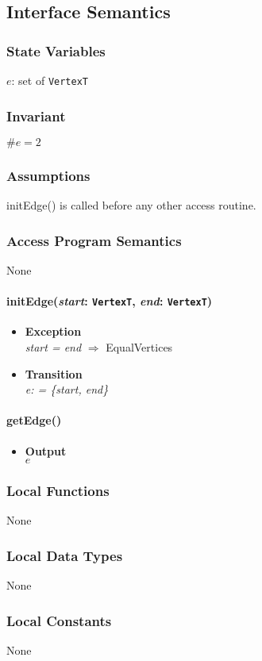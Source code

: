 \documentclass[12pt,titlepage]{article}
\begin{document}
\subsection{Interface Semantics}
\subsubsection{State Variables}
$e$: set of {\tt VertexT}
\subsubsection{Invariant} $\# e = 2$
\subsubsection{Assumptions}initEdge() is called before any other access routine.
\subsubsection{Access Program Semantics} None
\paragraph{initEdge({\it start}: {\tt VertexT}, {\it end}: {\tt VertexT})}
\begin{itemize}
\item \textbf{Exception}\\  {\it start = end} $\Longrightarrow$ EqualVertices
\item \textbf{Transition}\\ {\it e: = \{start, end\}} 
\end{itemize}

\paragraph{getEdge()}
\begin{itemize}
\item \textbf{Output}\\ $e$
\end{itemize}
\subsubsection{Local Functions} None
\subsubsection{Local Data Types} None
\subsubsection{Local Constants} None
\end{document}
